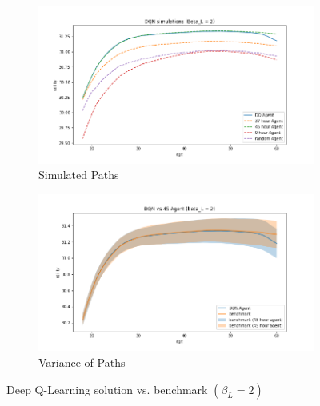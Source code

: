 \begin{figure}[ht]
\begin{subfigure}{.5\textwidth}
  \centering
  \includegraphics[width=1\linewidth]{figures/dqn_model1_beta_2_solution_benchmark_paths.png}
  \caption{Simulated Paths}
  \label{fig:dqn_solution_beta2_path}
\end{subfigure}%
\begin{subfigure}{.5\textwidth}
  \centering
  \includegraphics[width=1\linewidth]{figures/dqn_model1_beta_2_solution_benchmark_variance.png}
  \caption{Variance of Paths}
  \label{fig:dqn_solution_beta2_var}
\end{subfigure}
    \caption{Deep Q-Learning solution vs. benchmark $(\beta_L = 2)$}
    \label{fig:dqn_solution_beta2}
\end{figure}

